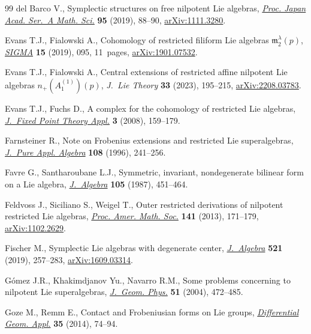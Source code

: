 \begin{thebibliography}{99}
del Barco V., Symplectic structures on free nilpotent {L}ie algebras,
 \href{https://doi.org/10.3792/pjaa.95.88}{\textit{Proc. Japan Acad. Ser.~A Math. Sci.}} \textbf{95} (2019), 88--90,
 \href{https://arxiv.org/abs/1111.3280}{arXiv:1111.3280}.

Evans T.J., Fialowski A., Cohomology of restricted filiform {L}ie algebras
 {${\mathfrak{m}}_2^\lambda(p)$}, \href{https://doi.org/10.3842/SIGMA.2019.095}{\textit{SIGMA}} \textbf{15} (2019), 095,
 11~pages, \href{https://arxiv.org/abs/1901.07532}{arXiv:1901.07532}.

Evans T.J., Fialowski A., Central extensions of restricted affine nilpotent
 {L}ie algebras {$n_+(A^{(1)}_1)(p)$}, \textit{J.~Lie Theory} \textbf{33}
 (2023), 195--215, \href{https://arxiv.org/abs/2208.03783}{arXiv:2208.03783}.

Evans T.J., Fuchs D., A complex for the cohomology of restricted {L}ie
 algebras, \href{https://doi.org/10.1007/s11784-008-0060-y}{\textit{J.~Fixed Point Theory Appl.}} \textbf{3} (2008), 159--179.

Farnsteiner R., Note on {F}robenius extensions and restricted {L}ie
 superalgebras, \href{https://doi.org/10.1016/0022-4049(95)00077-1}{\textit{J.~Pure Appl. Algebra}} \textbf{108} (1996), 241--256.

Favre G., Santharoubane L.J., Symmetric, invariant, nondegenerate bilinear form
 on a {L}ie algebra, \href{https://doi.org/10.1016/0021-8693(87)90209-2}{\textit{J.~Algebra}} \textbf{105} (1987), 451--464.

Feldvoss J., Siciliano S., Weigel T., Outer restricted derivations of nilpotent
 restricted {L}ie algebras, \href{https://doi.org/10.1090/S0002-9939-2012-11316-4}{\textit{Proc. Amer. Math. Soc.}} \textbf{141}
 (2013), 171--179, \href{https://arxiv.org/abs/1102.2629}{arXiv:1102.2629}.

Fischer M., Symplectic {L}ie algebras with degenerate center,
 \href{https://doi.org/10.1016/j.jalgebra.2018.11.038}{\textit{J.~Algebra}} \textbf{521} (2019), 257--283, \href{https://arxiv.org/abs/1609.03314}{arXiv:1609.03314}.

G\'omez J.R., Khakimdjanov Yu., Navarro R.M., Some problems concerning to
 nilpotent {L}ie superalgebras, \href{https://doi.org/10.1016/j.geomphys.2004.01.003}{\textit{J.~Geom. Phys.}} \textbf{51} (2004),
 472--485.

Goze M., Remm E., Contact and {F}robeniusian forms on {L}ie groups,
 \href{https://doi.org/10.1016/j.difgeo.2014.05.008}{\textit{Differential Geom. Appl.}} \textbf{35} (2014), 74--94.


\end{thebibliography}
